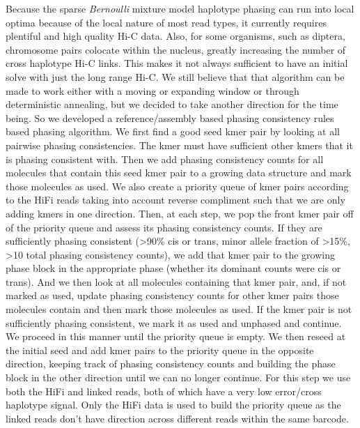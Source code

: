 {\par{
Because the sparse \textit{Bernoulli} mixture model haplotype phasing can run into local optima because of the local nature of most read types, it currently requires plentiful and high quality Hi-C data. Also, for some organisms, such as diptera, chromosome pairs colocate within the nucleus\cite{somaticpairing}, greatly increasing the number of cross haplotype Hi-C links. This makes it not always sufficient to have an initial solve with just the long range Hi-C. We still believe that that algorithm can be made to work either with a moving or expanding window or through deterministic annealing, but we decided to take another direction for the time being. So we developed a reference/assembly based phasing consistency rules based phasing algorithm. We first find a good seed kmer pair by looking at all pairwise phasing consistencies. The kmer must have sufficient other kmers that it is phasing consistent with. Then we add phasing consistency counts for all molecules that contain this seed kmer pair to a growing data structure and mark those molecules as used. We also create a priority queue of kmer pairs according to the HiFi reads taking into account reverse compliment such that we are only adding kmers in one direction. Then, at each step, we pop the front kmer pair off of the priority queue and assess its phasing consistency counts. If they are sufficiently phasing consistent (>90\% cis or trans, minor allele fraction of >15\%, >10 total phasing consistency counts), we add that kmer pair to the growing phase block in the appropriate phase (whether its dominant counts were cis or trans). And we then look at all molecules containing that kmer pair, and, if not marked as used, update phasing consistency counts for other kmer pairs those molecules contain and then mark those molecules as used. If the kmer pair is not sufficiently phasing consistent, we mark it as used and unphased and continue. We proceed in this manner until the priority queue is empty. We then reseed at the initial seed and add kmer pairs to the priority queue in the opposite direction, keeping track of phasing consistency counts and building the phase block in the other direction until we can no longer continue. For this step we use both the HiFi and linked reads, both of which have a very low error/cross haplotype signal. Only the HiFi data is used to build the priority queue as the linked reads don't have direction across different reads within the same barcode.
}

}
